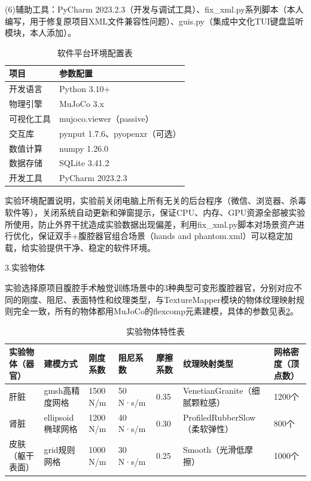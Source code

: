 (6)辅助工具：PyCharm
2023.2.3（开发与调试工具）、fix\_xml.py系列脚本（本人编写，用于修复原项目XML文件兼容性问题）、guis.py（集成中文化TUI键盘监听模块，本人添加）。

\begin{table}[H]
\centering
\caption{软件平台环境配置表}
\label{tab:5-2}
\footnotesize
\renewcommand{\arraystretch}{1.18}
\begin{tabularx}{\textwidth}{p{}X}
\toprule
项目 & 参数配置 \\
\midrule
开发语言 & Python 3.10+ \\
物理引擎 & MuJoCo 3.x \\
可视化工具 & mujoco.viewer（passive） \\
交互库 & pynput 1.7.6、pyopenxr（可选） \\
数值计算 & numpy 1.26.0 \\
数据存储 & SQLite 3.41.2 \\
开发工具 & PyCharm 2023.2.3 \\
\bottomrule
\end{tabularx}
\end{table}



实验环境配置说明，实验前关闭电脑上所有无关的后台程序（微信、浏览器、杀毒软件等），关闭系统自动更新和弹窗提示，保证CPU、内存、GPU资源全部被实验所使用，防止外界干扰造成实验数据出现偏差，利用fix\_xml.py脚本对场景资产进行优化，保证双手+腹腔器官组合场景（hands
and phantom.xml）可以稳定加载，给实验提供干净、稳定的软件环境。

3.实验物体

实验选择原项目腹腔手术触觉训练场景中的3种典型可变形腹腔器官，分别对应不同的刚度、阻尼、表面特性和纹理类型，与TextureMapper模块的物体纹理映射规则完全一致，所有的物体都用MuJoCo的flexcomp元素建模，具体的参数见表\ref{tab:5-3}。

\begin{table}[H]
\centering
\caption{实验物体特性表}
\label{tab:5-3}
\scriptsize
\renewcommand{\arraystretch}{1.18}
\begin{tabularx}{\textwidth}{p{}p{}p{}p{}p{}Xp{}}
\toprule
实验物体（器官） & 建模方式 & 刚度系数 & 阻尼系数 & 摩擦系数 & 纹理映射类型 & 网格密度（顶点数） \\
\midrule
肝脏 & gmsh高精度网格 & 1500 N/m & 50 N·s/m & 0.35 & VenetianGranite（细腻颗粒感） & 1200个 \\
肾脏 & ellipsoid椭球网格 & 1200 N/m & 40 N·s/m & 0.30 & ProfiledRubberSlow（柔软弹性） & 800个 \\
皮肤（躯干表面） & grid规则网格 & 1000 N/m & 30 N·s/m & 0.25 & Smooth（光滑低摩擦） & 1000个 \\
\bottomrule
\end{tabularx}
\end{table}



